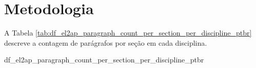 \section{Metodologia}

\lipsum[1-5]

A Tabela \ref{tab:df_el2ap_paragraph_count_per_section_per_discipline_ptbr} descreve a contagem de parágrafos por seção em cada disciplina.

{\scriptsize {df_el2ap_paragraph_count_per_section_per_discipline_ptbr}}

\lipsum[1-5]
